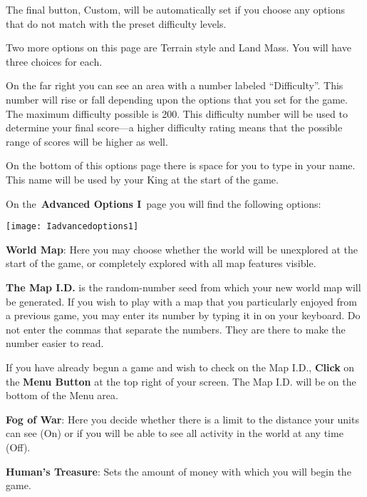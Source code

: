 The final button, Custom, will be automatically set if you choose any options that do not match with the preset difficulty levels.

Two more options on this page are Terrain style and Land Mass. You will have three choices for each.

On the far right you can see an area with a number labeled “Difficulty”. This number will rise or fall depending upon the options that you set for the game. The maximum difficulty possible is 200. This difficulty number will be used to determine your final score---a higher difficulty rating means that the possible range of scores will be higher as well.

On the bottom of this options page there is space for you to type in your name. This name will be used by your King at the start of the game.

On the \textbf{Advanced Options I} page you will find the following options:

\begin{center}
	\texttt{[image: Iadvancedoptions1]}
\end{center}

\textbf{World Map}: Here you may choose whether the world will be unexplored at the start of the game, or completely explored with all map features visible.

\begin{adjustwidth}{1cm}{}
 \textbf{The Map I.D.} is the random-number seed from which your new world map will be generated. If you wish to play with a map that you particularly enjoyed from a previous game, you may enter its number by typing it in on your keyboard. Do not enter the commas that separate the numbers. They are there to make the number easier to read.
\end{adjustwidth}

\begin{adjustwidth}{1cm}{}
 If you have already begun a game and wish to check on the Map I.D., \textbf{Click} on the \textbf{Menu Button} at the top right of your screen. The Map I.D. will be on the bottom of the Menu area.
\end{adjustwidth}

\textbf{Fog of War}: Here you decide whether there is a limit to the distance your units can see (On) or if you will be able to see all activity in the world at any time (Off).

\textbf{Human’s Treasure}: Sets the amount of money with which you will begin the game.

